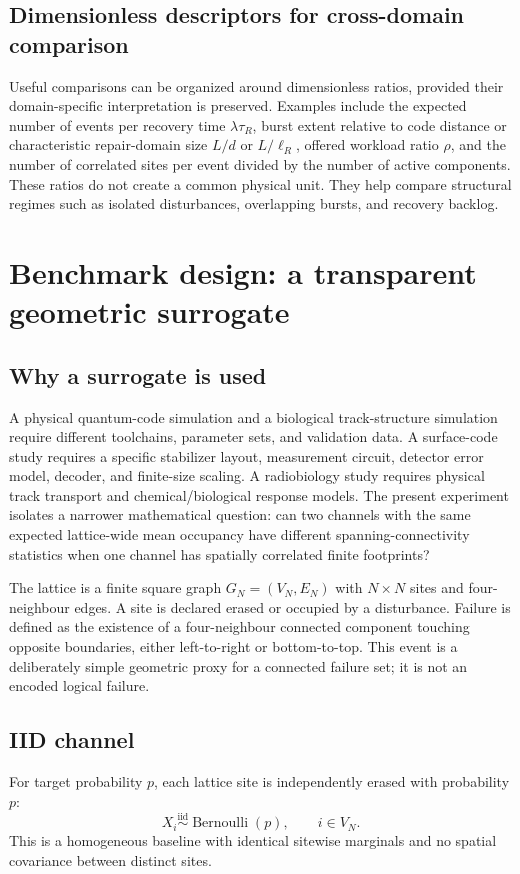 \documentclass[11pt,a4paper,oneside]{article}
\begin{document}
\subsection{Dimensionless descriptors for cross-domain comparison}
Useful comparisons can be organized around dimensionless ratios, provided their domain-specific interpretation is preserved. Examples include the expected number of events per recovery time \(\lambda\tau_R\), burst extent relative to code distance or characteristic repair-domain size \(L/d\) or \(L/\ell_R\), offered workload ratio \(\rho\), and the number of correlated sites per event divided by the number of active components. These ratios do not create a common physical unit. They help compare structural regimes such as isolated disturbances, overlapping bursts, and recovery backlog.

\section{Benchmark design: a transparent geometric surrogate}
\label{sec:benchmark}
\subsection{Why a surrogate is used}
A physical quantum-code simulation and a biological track-structure simulation require different toolchains, parameter sets, and validation data. A surface-code study requires a specific stabilizer layout, measurement circuit, detector error model, decoder, and finite-size scaling. A radiobiology study requires physical track transport and chemical/biological response models. The present experiment isolates a narrower mathematical question: can two channels with the same expected lattice-wide mean occupancy have different spanning-connectivity statistics when one channel has spatially correlated finite footprints?

The lattice is a finite square graph \(G_N=(V_N,E_N)\) with \(N\times N\) sites and four-neighbour edges. A site is declared erased or occupied by a disturbance. Failure is defined as the existence of a four-neighbour connected component touching opposite boundaries, either left-to-right or bottom-to-top. This event is a deliberately simple geometric proxy for a connected failure set; it is not an encoded logical failure.

\subsection{IID channel}
For target probability \(p\), each lattice site is independently erased with probability \(p\):
\begin{equation}\label{eq:iid}
X_i\overset{\mathrm{iid}}{\sim}\operatorname{Bernoulli}(p),\qquad i\in V_N.
\end{equation}
This is a homogeneous baseline with identical sitewise marginals and no spatial covariance between distinct sites.
\end{document}
